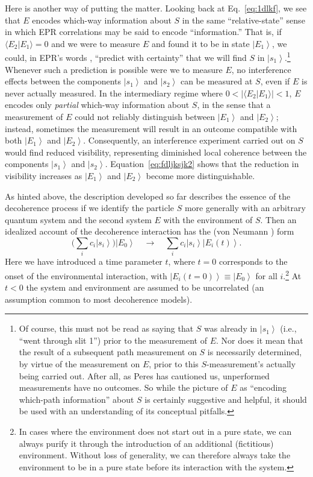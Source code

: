 \documentclass[3p,sort&compress,12pt]{elsarticle}
\newcommand{\ket}[1]{\left\vert{#1}\right\rangle}
\newcommand{\braket}[2]{\ensuremath{{\langle #1}|{#2 \rangle}}}
\providecommand{\abs}[1]{\left\lvert#1\right\rvert}
\begin{document}
Here is another way of putting the matter. Looking back at Eq.~\eqref{eq:1dlkf}, we see that $E$ encodes which-way information about $S$ in the same ``relative-state'' sense \cite{Everett:1957:rw} in which EPR correlations \cite{Einstein:1935:dr,Bell:1964:ep,Bell:1966:ph} may be said to encode ``information.'' That is, if $\braket{E_2}{E_1} = 0$ and we were to measure $E$ and found it to be in state $\ket{E_1}$, we could, in EPR's words \cite[p.~777]{Einstein:1935:dr}, ``predict with certainty'' that we will find $S$ in $\ket{s_1}$.\footnote{Of course, this must not be read as saying that $S$ was already in $\ket{s_1}$ (i.e., ``went through slit 1'') prior to the measurement of $E$. Nor does it mean that the result of a subsequent path measurement on $S$ is necessarily determined, by virtue of the measurement on $E$, prior to this $S$-measurement's actually being carried out. After all, as Peres \cite{Peres:1978:aa} has cautioned us, unperformed measurements have no outcomes. So while the picture of $E$ as ``encoding which-path information'' about $S$ is certainly suggestive and helpful, it should be used with an understanding of its conceptual pitfalls.} Whenever such a prediction is possible were we to measure $E$, no interference effects between the components $\ket{s_1}$ and $\ket{s_2}$ can be measured at $S$, even if $E$ is never actually measured. In the intermediary regime where $0 < \abs{\braket{E_2}{E_1}} < 1$, $E$ encodes only \emph{partial} which-way information about $S$, in the sense that a measurement of $E$ could not reliably distinguish between $\ket{E_1}$ and $\ket{E_2}$; instead, sometimes the measurement will result in an outcome compatible with both $\ket{E_1}$ and $\ket{E_2}$. Consequently, an interference experiment carried out on $S$ would find reduced visibility, representing diminished local coherence between the components $\ket{s_1}$ and $\ket{s_2}$. Equation~\eqref{eq:fdljksjk2} shows that the reduction in visibility increases as $\ket{E_1}$ and $\ket{E_2}$ become more distinguishable.

As hinted above, the description developed so far describes the essence of the decoherence process if we identify the particle $S$ more generally with an arbitrary quantum system and the second system $E$ with the environment of $S$. Then an idealized account of the decoherence interaction has the (von Neumann \cite{Neumann:1932:gq}) form 
%
\begin{equation}
\label{eq:d1}
\biggl( \sum_i c_i \ket{s_i} \biggr) \ket{E_0} \quad \longrightarrow \quad \sum_i c_i \ket{s_i} \ket{E_i(t)}.
\end{equation}
%
Here we have introduced a time parameter $t$, where $t=0$ corresponds to the onset of the environmental interaction, with $\ket{E_i(t=0)} \equiv \ket{E_0}$ for all $i$.\footnote{In cases where the environment does not start out in a pure state, we can always purify it through the introduction of an additional (fictitious) environment. Without loss of generality, we can therefore always take the environment to be in a pure state before its interaction with the system.} At $t<0$ the system and environment are assumed to be uncorrelated (an assumption common to most decoherence models). 
\end{document}
